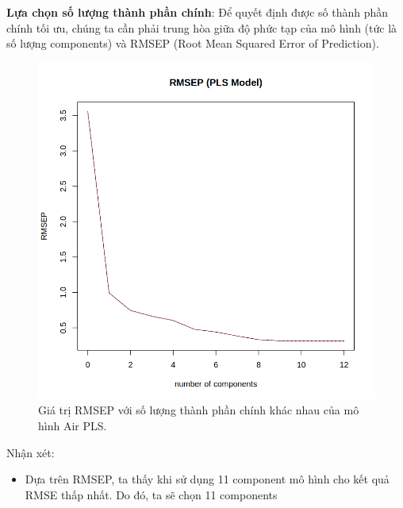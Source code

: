 \textbf{Lựa chọn số lượng thành phần chính}: Để quyết định được số thành phần chính tối ưu, chúng ta cần phải trung hòa giữa độ phức tạp của mô hình (tức là số lượng components) và RMSEP (Root Mean Squared Error of Prediction).

\begin{figure}[H]
    \centering
    \includegraphics[width=0.75\columnwidth]{air_figures/pls_model.png}
    \caption{Giá trị RMSEP với số lượng thành phần chính khác nhau của mô hình Air PLS.}
    \label{fig:air_pls_model}
\end{figure}
Nhận xét:
\begin{itemize}
    \item Dựa trên RMSEP, ta thấy khi sử dụng 11 component mô hình cho kết quả RMSE thấp nhất. Do đó, ta sẽ chọn 11 components
\end{itemize}

